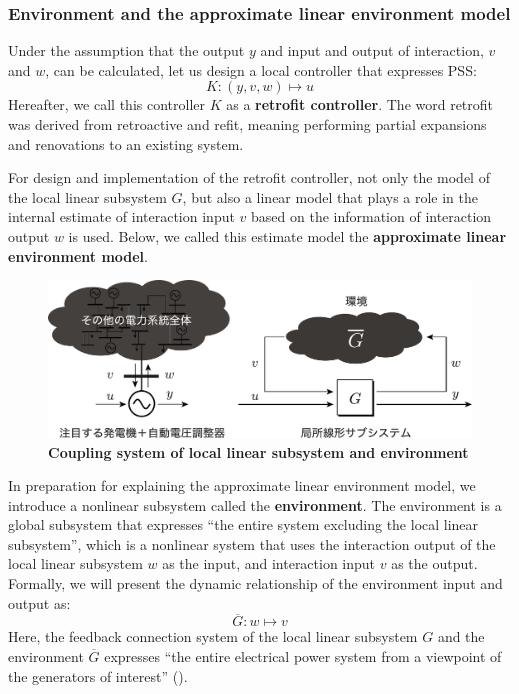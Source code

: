 \documentclass[graybox, envcountchap]{svmult}
\begin{document}
\smallskip
\subsubsection{Environment and the approximate linear environment model}

Under the assumption that the output $y$ and input and output of interaction, $v$ and $w$, can be calculated, let us design a local controller that expresses PSS:
\[
K : (y,v,w)\mapsto u
\]
Hereafter, we call this controller $K$ as a \textbf{retrofit controller}.
The word retrofit was derived from retroactive and refit, meaning performing partial expansions and renovations to an existing system.

For design and implementation of the retrofit controller, not only the model of the local linear subsystem $G$, but also a linear model that plays a role in the internal estimate of interaction input $v$ based on the information of interaction output $w$ is used.
Below, we called this estimate model the \textbf{approximate linear environment model}.

\begin{figure}[t]
\centering
\includegraphics[width = .99\linewidth]{figs/retconsys2}
\medskip
\caption{\textbf{Coupling system of local linear subsystem and environment}}
\label{fig:retconsys}
\medskip
\end{figure}


In preparation for explaining the approximate linear environment model, we introduce a nonlinear subsystem called the \textbf{environment}.
The environment is a global subsystem that expresses “the entire system excluding the local linear subsystem”, which is a nonlinear system that uses the interaction output of the local linear subsystem $w$ as the input, and interaction input $v$ as the output.
Formally, we will present the dynamic relationship of the environment input and output as:
\[
\overline{G} : w\mapsto v
\]
Here, the feedback connection system of the local linear subsystem $G$ and the environment $\overline{G}$ expresses “the entire electrical power system from a viewpoint of the generators of interest” ().
\end{document}
